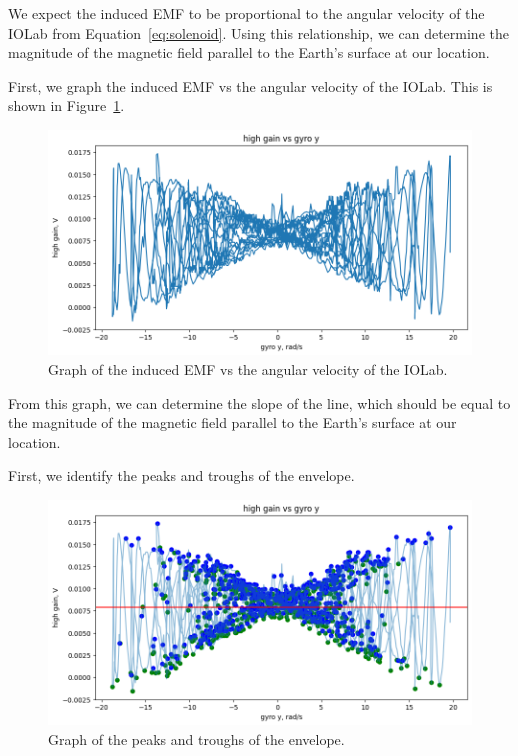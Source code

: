 \documentclass[11pt]{article}
\begin{document}
    We expect the induced EMF to be proportional to the angular velocity of the IOLab from Equation~\ref{eq:solenoid}.
    Using this relationship, we can determine the magnitude of the magnetic field parallel to the Earth's surface at our location.

    First, we graph the induced EMF vs the angular velocity of the IOLab.
    This is shown in Figure~\ref{fig:part_1_graph}.

    \begin{figure}[H]
        \centering
        \includegraphics[width=0.8\linewidth]{resources/images/part 1 graph}
        \caption{Graph of the induced EMF vs the angular velocity of the IOLab.}
        \label{fig:part_1_graph}
    \end{figure}

    From this graph, we can determine the slope of the line, which should be equal to the magnitude of the magnetic field parallel to the Earth's surface at our location.

    First, we identify the peaks and troughs of the envelope.

    \begin{figure}[H]
        \centering
        \includegraphics[width=0.8\linewidth]{resources/images/part 1 peaks}
        \caption{Graph of the peaks and troughs of the envelope.}
        \label{fig:part_1_peaks_and_troughs}
    \end{figure}
\end{document}
